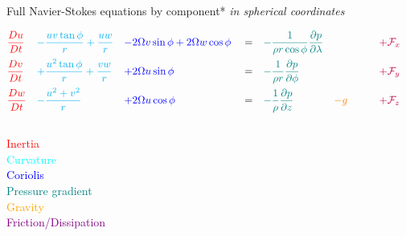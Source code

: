 \documentclass[aspectratio=169,xcolor=dvipsnames]{beamer}
\newcommand{\myarrow}[1][]{
  \begin{tikzpicture}[#1]
  \draw[-{Latex[length=2mm, width=2mm]}, draw=black]
    (0,0.5em) -- (0,0) -- ++(1em,0);
  \end{tikzpicture}
}
\begin{document}
\begin{frame}{Full Navier-Stokes equations by component*}
\vspace{0em}
\hspace{10cm}
{\small *\emph{in spherical coordinates}}

\begin{align*}
    &\textcolor{red}{    \frac{Du}{Dt}   }&
    &\textcolor{cyan}{   - \frac{uv \tan\phi}{r} + \frac{uw}{r}  }& 
    & \textcolor{blue}{   - 2\Omega v \sin\phi + 2\Omega w \cos\phi   }&
    & = &
    &\textcolor{teal}{   -\frac{1}{\rho r \cos\phi}\frac{\partial p}{\partial \lambda}  }&
    &&
    & \textcolor{purple}{\quad + \mathcal{F}_x }&
    \\
    &\textcolor{red}{    \frac{Dv}{Dt}   } &
    &\textcolor{cyan}{   + \frac{u^2 \tan\phi}{r} + \frac{vw}{r}     }&
    & \textcolor{blue}{   + 2\Omega u \sin\phi    }&
    & = &
    &\textcolor{teal}{   -\frac{1}{\rho r}\frac{\partial p}{\partial \phi}  }&
    &&
    & \textcolor{purple}{\quad + \mathcal{F}_y }&
    \\
    &\textcolor{red}{    \frac{Dw}{Dt}   } &
    &\textcolor{cyan}{   - \frac{u^2 + v^2}{r}   }&
    & \textcolor{blue}{   + 2\Omega u \cos\phi    }&
    & = &
    &\textcolor{teal}{   -\frac{1}{\rho}\frac{\partial p}{\partial z} }&
    & \textcolor{orange}{- g \quad}&
    & \textcolor{purple}{\quad + \mathcal{F}_z }&
\end{align*}

\begin{columns}
    \begin{column}{0.4\textwidth}
        \begin{flushright}
            \vspace{-2em}
            {\footnotesize 
            \textcolor{red}{Inertia} \\
            \textcolor{cyan}{Curvature} \\
            \textcolor{blue}{Coriolis} \\
            \textcolor{teal}{Pressure gradient} \\
            \textcolor{orange}{Gravity} \\
            \textcolor{purple}{Friction/Dissipation}
            }
        \end{flushright}
    \end{column}
\end{columns}
        
\end{frame}
\end{document}
